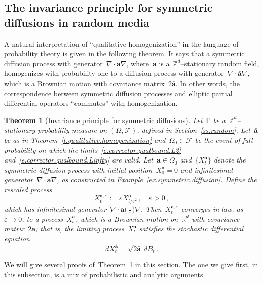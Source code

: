 \documentclass[11pt]{article} %
\numberwithin{equation}{section}
\newtheorem{theorem}{Theorem}[section]
\theoremstyle{definition}
\newcommand*{\Zd}{\ensuremath{\mathbb{Z}^d}}
\newcommand*{\Rd}{\ensuremath{\mathbb{R}^d}}
\newcommand{\eps}{\varepsilon}
\newcommand{\ep}{\eps}
\renewcommand{\a}{\mathbf{a}}
\newcommand{\ahom}{\bar{\a}}
\newcommand{\F}{\mathcal{F}}
\renewcommand{\P}{\mathbb{P}}
\begin{document}
\subsection{The invariance principle for symmetric diffusions in random media}
\label{ss.invariance}



A natural interpretation of ``qualitative homogenization'' in the language of probability theory is given in the following theorem. It says that a symmetric diffusion process with generator~$\nabla \cdot\a\nabla$, where~$\a$ is a~$\Zd$--stationary random field, homogenizes with probability one to a diffusion process with generator~$\nabla\cdot \ahom \nabla$, which is a Brownian motion with covariance matrix~$2\ahom$. In other words, the correspondence between symmetric diffusion processes and elliptic partial differential operators ``commutes'' with homogenization. 


\begin{theorem}[Invariance principle for symmetric diffusions]
\label{t.invariance}
Let~$\P$ be a~$\Zd$--stationary probability measure on $(\Omega,\F)$, defined in Section~\ref{ss.random}. Let~$\ahom$ be as in Theorem~\ref{t.qualitative.homogenization} and~$\Omega_0 \in \F$ be the event of full probability on which the limits~\eqref{e.corrector.qualbound.L2} and~\eqref{e.corrector.qualbound.Linfty} are valid. 
Let~$\a\in \Omega_0$ and~$\{ X_t^\a\}$ denote the symmetric diffusion process with initial position~$X_0^\a=0$ and infinitesimal generator~$\nabla \cdot \a\nabla$, as constructed in Example~\ref{ex.symmetric.diffusion}.  
Define the rescaled process 
\begin{equation*}
X^{\a,\ep}_t := \ep X^\a_{ t/{\ep^2} }\,, \quad \ep > 0\,,
\end{equation*}
which has infinitesimal generator~$\nabla \cdot \a\bigl( \tfrac \cdot \ep \bigr) \nabla$. Then~$X^{\a,\ep}_t$ converges in law, as~$\ep \to 0$, to a process~$X^{\ahom}_t$, which is a Brownian motion on~$\Rd$ with covariance matrix~$2\ahom$; that is, the limiting process~$X^{\ahom}_t$ satisfies the stochastic differential equation
\begin{equation*}
dX^{\ahom}_t = \sqrt{2\ahom}\, dB_t\,.
\end{equation*}
\end{theorem}


We will give several proofs of~Theorem~\ref{t.invariance} in this section. 
The one we give first, in this subsection, is a mix of probabilistic and analytic arguments. 
\end{document}
